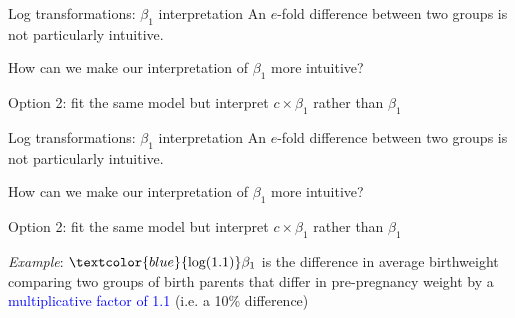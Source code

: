 \documentclass[10pt,t]{beamer}
\begin{document}
\begin{frame}{Log transformations: $\beta_1$ interpretation}
An $e$-fold difference between two groups is not particularly intuitive.

How can we make our interpretation of $\beta_1$ more intuitive?

\vspace{0.3cm}

Option 2: fit the same model but interpret $c \times \beta_1$ rather than $\beta_1$


\end{frame}

\begin{frame}{Log transformations: $\beta_1$ interpretation}
An $e$-fold difference between two groups is not particularly intuitive.

How can we make our interpretation of $\beta_1$ more intuitive?

\vspace{0.3cm}

Option 2: fit the same model but interpret $c \times \beta_1$ rather than $\beta_1$

\vspace{0.3cm}

\textit{Example}: $\textcolor{blue}{\text{log}(1.1)}\beta_1$ is the difference in average birthweight comparing two groups of birth parents that differ in pre-pregnancy weight by a \textcolor{blue}{multiplicative factor of 1.1} (i.e. a 10\% difference)


\end{frame}
\end{document}
